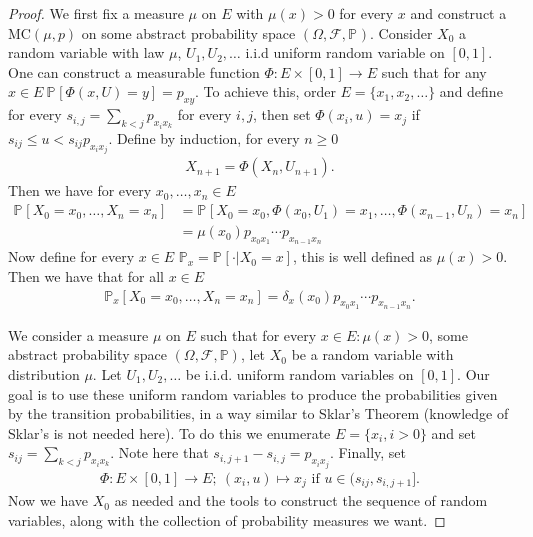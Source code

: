 \begin{proof}
	We first fix a measure $\mu $ on $E$ with $\mu (x)>0$ for every $x$ and construct a MC$(\mu,p)$ on some abstract probability space $(\Omega, \mathcal{F}, \mathbb{P}_{})$. Consider $X_0$ a random variable with law $\mu $, $U_1, U_2, \ldots$ i.i.d uniform random variable on  $[0,1]$. One can construct a measurable function $\Phi: E \times [0,1] \to E$ such that for any  $x \in E\ \mathbb{P}_{} \left[ \Phi(x,U)=y \right] = p_{xy}$. To achieve this, order $E=\{x_1, x_2, \ldots \}$ and define for every  $s_{i,j} = \sum_{k<j}^{} p_{x_ix_k}$ for every $i, j$, then set $\Phi(x_i, u) = x_j$ if $s_{ij}\leq u < s_{ij} p_{x_ix_j}$. Define by induction, for every $n\geq 0$ 
	\begin{align}
		X_{n+1} = \Phi(X_n, U_{n+1}).
	\end{align}
Then we have for every $x_0, \ldots, x_n \in E$ 
\begin{align}
	\mathbb{P}_{} \left[ X_0=x_0, \ldots ,X_n=x_n \right] &=
		\mathbb{P}_{} \left[ X_0=x_0, \Phi(x_0, U_1)=x_1 , \ldots , \Phi(x_{n-1}, U_{n}) = x_n \right] \\
	&= \mu(x_0)p_{x_0x_1} \cdots p_{x_{n-1}x_n}
\end{align}
Now define for every $x \in E$ $\mathbb{P}_{x}  = \mathbb{P}_{} \left[ \cdot | X_0 = x \right] $, this is well defined as $\mu (x)>0$. Then we have that for all $x \in E$ 
\begin{align}
	\mathbb{P}_{x} \left[ X_0 = x_0, \ldots, X_n = x_n \right] = \delta_x(x_0) p_{x_0 x_1} \cdots p_{x_{n-1}x_n}.
\end{align}

{\color{blue}
We consider a measure $\mu $ on $E$ such that for every $x \in E: \mu (x) >0$, some abstract probability space $(\Omega, \mathcal{F}, \mathbb{P} )$, let $X_0$ be a random variable with distribution $\mu $. Let $U_1,U_2, \ldots $ be i.i.d. uniform  random variables on $[0,1]$. Our goal is to use these uniform random variables to produce the probabilities given by the transition probabilities, in a way similar to Sklar's Theorem (knowledge of Sklar's is not needed here). To do this we enumerate $E=\{x_i, i> 0 \}$ and set $s_{ij}= \sum_{k<j}p_{x_ix_k} $. Note here that $s_{i,j+1}-s_{i,j} = p_{x_ix_j} $. Finally, set
\begin{align}
	\Phi: E \times [0,1] \to E;\ (x_i,u) \mapsto x_j \textrm{ if } u \in (s_{ij}, s_{i,j+1}]
.\end{align}
Now we have $X_0$ as needed and the tools to construct the sequence of random variables, along with the collection of probability measures we want.

}
\end{proof}
